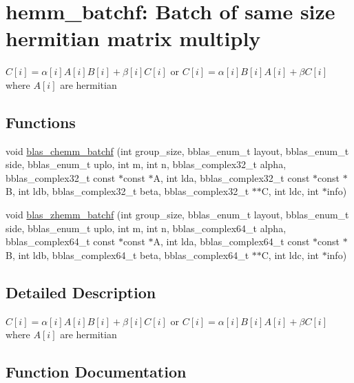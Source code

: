 \hypertarget{group__hemm__batchf}{}\section{hemm\+\_\+batchf\+: Batch of same size hermitian matrix multiply}
\label{group__hemm__batchf}


$ C[i] = \alpha[i] A[i] B[i] + \beta[i] C[i] $ or $ C[i] = \alpha[i] B[i] A[i] + \beta C[i] $ where $ A[i] $ are hermitian  


\subsection*{Functions}
\begin{DoxyCompactItemize}
\item 
void \mbox{\hyperlink{group__hemm__batchf_ga76250ab55350229248296033e39c68cc}{blas\+\_\+chemm\+\_\+batchf}} (int group\+\_\+size, bblas\+\_\+enum\+\_\+t layout, bblas\+\_\+enum\+\_\+t side, bblas\+\_\+enum\+\_\+t uplo, int m, int n, bblas\+\_\+complex32\+\_\+t alpha, bblas\+\_\+complex32\+\_\+t const $\ast$const $\ast$A, int lda, bblas\+\_\+complex32\+\_\+t const $\ast$const $\ast$B, int ldb, bblas\+\_\+complex32\+\_\+t beta, bblas\+\_\+complex32\+\_\+t $\ast$$\ast$C, int ldc, int $\ast$info)
\item 
void \mbox{\hyperlink{group__hemm__batchf_gaf6cd524bb78c2bab51170b200b76cfa8}{blas\+\_\+zhemm\+\_\+batchf}} (int group\+\_\+size, bblas\+\_\+enum\+\_\+t layout, bblas\+\_\+enum\+\_\+t side, bblas\+\_\+enum\+\_\+t uplo, int m, int n, bblas\+\_\+complex64\+\_\+t alpha, bblas\+\_\+complex64\+\_\+t const $\ast$const $\ast$A, int lda, bblas\+\_\+complex64\+\_\+t const $\ast$const $\ast$B, int ldb, bblas\+\_\+complex64\+\_\+t beta, bblas\+\_\+complex64\+\_\+t $\ast$$\ast$C, int ldc, int $\ast$info)
\end{DoxyCompactItemize}


\subsection{Detailed Description}
$ C[i] = \alpha[i] A[i] B[i] + \beta[i] C[i] $ or $ C[i] = \alpha[i] B[i] A[i] + \beta C[i] $ where $ A[i] $ are hermitian 



\subsection{Function Documentation}
\mbox{\label{group__hemm__batchf_ga76250ab55350229248296033e39c68cc}} 
